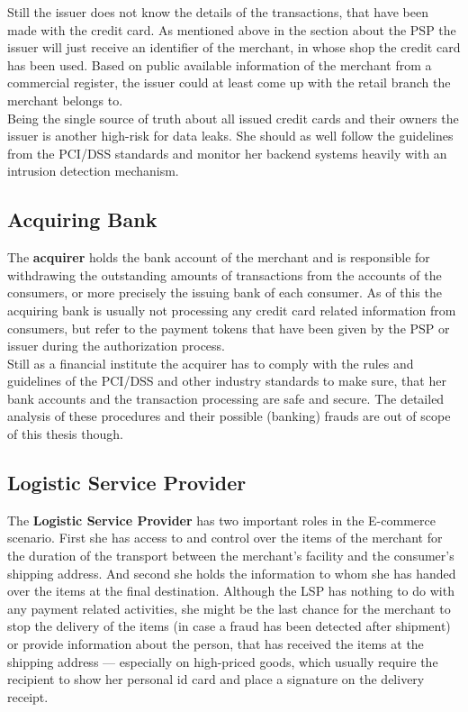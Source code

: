 Still the issuer does not know the details of the transactions, that have been made with the credit card. As mentioned above in the section about the \gls{PSP} the issuer will just receive an identifier of the merchant, in whose shop the credit card has been used. Based on public available information of the merchant from a commercial register, the issuer could at least come up with the retail branch the merchant belongs to. \\

Being the single source of truth about all issued credit cards and their owners the issuer is another high-risk for data leaks. She should as well follow the guidelines from the PCI/DSS standards and monitor her backend systems heavily with an intrusion detection mechanism.


\subsection{Acquiring Bank}
\label{subsec:stakeholder_acquirer}

The \textbf{acquirer} holds the bank account of the merchant and is responsible for withdrawing the outstanding amounts of transactions from the accounts of the consumers, or more precisely the issuing bank of each consumer. As of this the acquiring bank is usually not processing any credit card related information from consumers, but refer to the payment tokens that have been given by the \gls{PSP} or issuer during the authorization process. \\

Still as a financial institute the acquirer has to comply with the rules and guidelines of the PCI/DSS and other industry standards to make sure, that her bank accounts and the transaction processing are safe and secure. The detailed analysis of these procedures and their possible (banking) frauds are out of scope of this thesis though.


\subsection{Logistic Service Provider}
\label{subsec:stakeholder_lsp}

The \textbf{Logistic Service Provider} has two important roles in the E-commerce scenario. First she has access to and control over the items of the merchant for the duration of the transport between the merchant's facility and the consumer's shipping address. And second she holds the information to whom she has handed over the items at the final destination. Although the \gls{LSP} has nothing to do with any payment related activities, she might be the last chance for the merchant to stop the delivery of the items (in case a fraud has been detected after shipment) or provide information about the person, that has received the items at the shipping address --- especially on high-priced goods, which usually require the recipient to show her personal id card and place a signature on the delivery receipt. \\

